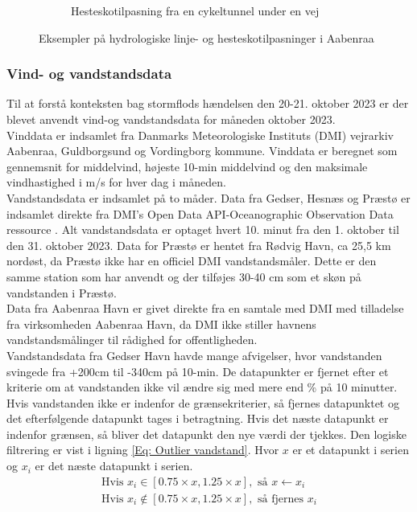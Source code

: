 \begin{figure}[H]
\begin{subfigure}[b]{0.5\textwidth}
        \caption{Hesteskotilpasning fra en cykeltunnel under en vej}
        \label{Subfig: Hesteskotilpasning}
    \end{subfigure}
    \caption{Eksempler på hydrologiske linje- og hesteskotilpasninger i Aabenraa}
    \label{Figur: Linje- og hesteskotilpasninger}
\end{figure}

\subsubsection{Vind- og vandstandsdata} \label{Vind- og vandstandsdata}
Til at forstå konteksten bag stormflods hændelsen den 20-21. oktober 2023 er der blevet anvendt vind-og vandstandsdata for måneden oktober 2023. \\
Vinddata er indsamlet fra Danmarks Meteorologiske Instituts (DMI) vejrarkiv \citep{dmi_vejrarkiv} Aabenraa, Guldborgsund og Vordingborg kommune. 
Vinddata er beregnet som gennemsnit for middelvind, højeste 10-min middelvind og den maksimale vindhastighed i m/s for hver dag i måneden. \\

Vandstandsdata er indsamlet på to måder. Data fra Gedser, Hesnæs og Præstø er indsamlet direkte fra DMI's Open Data API-Oceanographic Observation Data ressource \citep{dmi_open_data}. Alt vandstandsdata er optaget hvert 10. minut fra den 1. oktober til den 31. oktober 2023. Data for Præstø er hentet fra Rødvig Havn, ca 25,5 km nordøst, da Præstø ikke har en officiel DMI vandstandsmåler. Dette er den samme station som \cite{cowi_praesto_2025} har anvendt og der tilføjes 30-40 cm som et skøn på vandstanden i Præstø. \\
Data fra Aabenraa Havn er givet direkte fra en samtale med DMI med tilladelse fra virksomheden Aabenraa Havn, da DMI ikke stiller havnens vandstandsmålinger til rådighed for offentligheden. \\

Vandstandsdata fra Gedser Havn havde mange afvigelser, hvor vandstanden svingede fra +200cm til -340cm på 10-min. De datapunkter er fjernet efter et kriterie om at vandstanden ikke vil ændre sig med mere end \% på 10 minutter. Hvis vandstanden ikke er indenfor de grænsekriterier, så fjernes datapunktet og det efterfølgende datapunkt tages i betragtning. Hvis det næste datapunkt er indenfor grænsen, så bliver det datapunkt den nye værdi der tjekkes. Den logiske filtrering er vist i ligning \ref{Eq: Outlier vandstand}. Hvor $x$ er et datapunkt i serien og $x_i$ er det næste datapunkt i serien.
\begin{align} \label{Eq: Outlier vandstand}
    \text{Hvis } x_i \in [0.75\times x, 1.25\times x], \text{ så } x \leftarrow x_i \nonumber \\
    \text{Hvis } x_i \notin [0.75\times x, 1.25\times x], \text{ så fjernes } x_i
\end{align}

